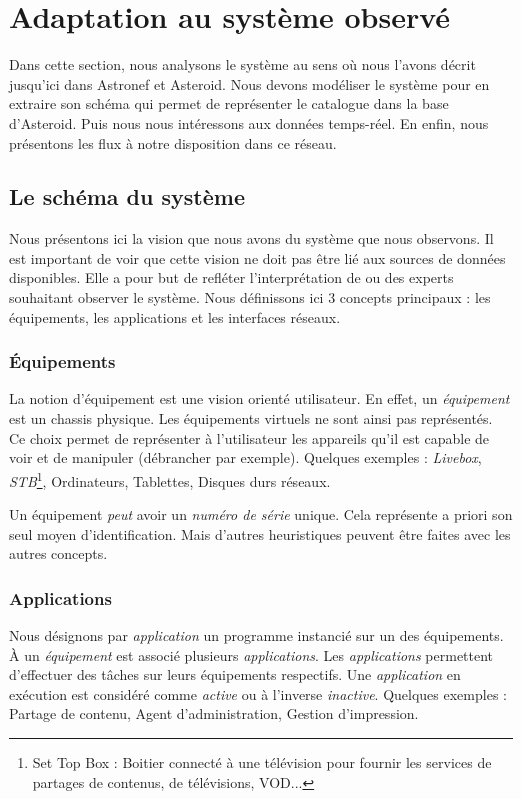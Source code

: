 \section{Adaptation au système observé}\label{sec:valid:domvision:systeme}
Dans cette section, nous analysons le système au sens où nous l'avons décrit jusqu'ici dans Astronef et Asteroid. Nous devons modéliser le système pour en extraire son schéma qui permet de représenter le catalogue dans la base d'Asteroid. Puis nous nous intéressons aux données temps-réel. En enfin, nous présentons les flux à notre disposition dans ce réseau.

\subsection{Le schéma du système}
Nous présentons ici la vision que nous avons du système que nous observons. Il est important de voir que cette vision ne doit pas être lié aux sources de données disponibles. Elle a pour but de refléter l'interprétation de ou des experts souhaitant observer le système. Nous définissons ici 3 concepts principaux : les équipements, les applications et les interfaces réseaux.

\subsubsection{Équipements}
La notion d'équipement est une vision orienté utilisateur. En effet, un \textit{équipement} est un chassis physique. Les équipements virtuels ne sont ainsi pas représentés. Ce choix permet de représenter à l'utilisateur les appareils qu'il est capable de voir et de manipuler (débrancher par exemple). Quelques exemples : \textit{Livebox}, \textit{STB}\footnote{Set Top Box : Boitier connecté à une télévision pour fournir les services de partages de contenus, de télévisions, VOD...}, Ordinateurs, Tablettes, Disques durs réseaux.

Un équipement \textit{peut} avoir un \textit{numéro de série} unique. Cela représente a priori son seul moyen d'identification. Mais d'autres heuristiques peuvent être faites avec les autres concepts.

\subsubsection{Applications}
Nous désignons par \textit{application} un programme instancié sur un des équipements. À un \textit{équipement} est associé plusieurs \textit{applications}. Les \textit{applications} permettent d'effectuer des tâches sur leurs équipements respectifs. Une \textit{application} en exécution est considéré comme \textit{active} ou à l'inverse \textit{inactive}. Quelques exemples : Partage de contenu, Agent d'administration, Gestion d'impression.

